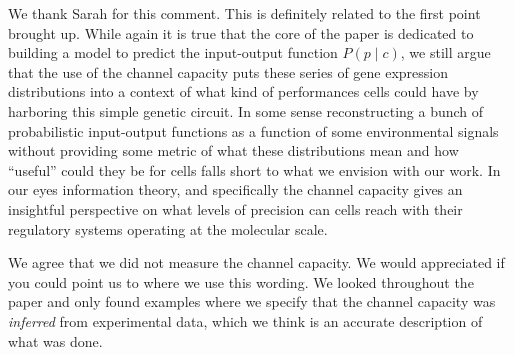 We thank Sarah for this comment. This is definitely related to the first point
brought up. While again it is true that the core of the paper is dedicated to
building a model to predict the input-output function $P(p \mid c)$, we still
argue that the use of the channel capacity puts these series of gene expression
distributions into a context of what kind of performances cells could have by
harboring this simple genetic circuit. In some sense reconstructing a bunch of
probabilistic input-output functions as a function of some environmental signals
without providing some metric of what these distributions mean and how
``useful'' could they be for cells falls short to what we envision with our
work. In our eyes information theory, and specifically the channel capacity
gives an insightful perspective on what levels of precision can cells reach with
their regulatory systems operating at the molecular scale.

We agree that we did not measure the channel capacity. We would appreciated if
you could point us to where we use this wording. We looked throughout the paper
and only found examples where we specify that the channel capacity was
\textit{inferred} from experimental data, which we think is an accurate
description of what was done.
